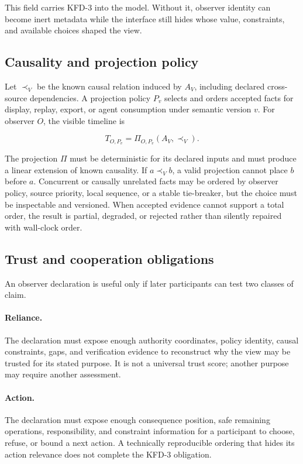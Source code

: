 This field carries KFD-3 into the model. Without it, observer identity can
become inert metadata while the interface still hides whose value, constraints,
and available choices shaped the view.

\subsection{Causality and projection policy}

Let $\prec_V$ be the known causal relation induced by $A_V$, including declared
cross-source dependencies. A projection policy $P_v$ selects and orders
accepted facts for display, replay, export, or agent consumption under semantic
version $v$. For observer $O$, the visible timeline is

\begin{equation}
T_{O,P_v} = \Pi_{O,P_v}(A_V, \prec_V).
\end{equation}

The projection $\Pi$ must be deterministic for its declared inputs and must
produce a linear extension of known causality. If $a \prec_V b$, a valid
projection cannot place $b$ before $a$. Concurrent or causally unrelated facts
may be ordered by observer policy, source priority, local sequence, or a stable
tie-breaker, but the choice must be inspectable and versioned. When accepted
evidence cannot support a total order, the result is partial, degraded, or
rejected rather than silently repaired with wall-clock order.

\subsection{Trust and cooperation obligations}

An observer declaration is useful only if later participants can test two
classes of claim.

\paragraph{Reliance.}
The declaration must expose enough authority coordinates, policy identity,
causal constraints, gaps, and verification evidence to reconstruct why the
view may be trusted for its stated purpose. It is not a universal trust score;
another purpose may require another assessment.

\paragraph{Action.}
The declaration must expose enough consequence position, safe remaining
operations, responsibility, and constraint information for a participant to
choose, refuse, or bound a next action. A technically reproducible ordering that
hides its action relevance does not complete the KFD-3 obligation.

